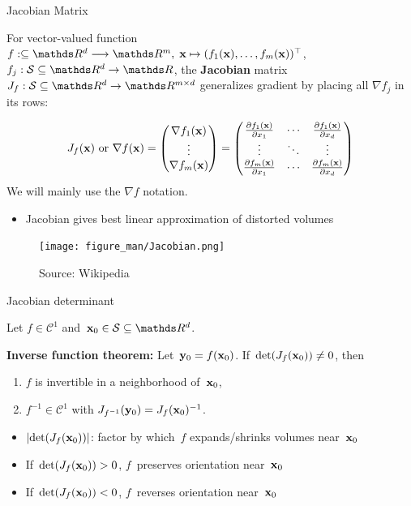 \documentclass[11pt,compress,t,notes=noshow, xcolor=table]{beamer}
\begin{document}
\begin{vbframe}{Jacobian Matrix}

For vector-valued function~$f:\subseteq \R^d\longrightarrow\R^m,\; \xv\mapsto(f_1(\xv),\dots,f_m(\xv))^\top$, $f_j:\mathcal{S}\subseteq \R^d\to\R$, the \textbf{Jacobian} matrix $J_f:\mathcal{S}\subseteq \R^d \to \R^{m\times d}$ generalizes gradient by placing all $\nabla f_j$ in its rows:

\begin{equation*}
    J_f(\mathbf{x}) \text{ or } \nabla f(\mathbf{x}) = \begin{pmatrix}
        \nabla f_1(\mathbf{x}) \\
        \vdots \\
        \nabla f_m(\mathbf{x})
	\end{pmatrix}
    =
    \begin{pmatrix}
        \frac{\partial f_1(\mathbf{x})}{\partial x_1} & \cdots & \frac{\partial f_1(\mathbf{x})}{\partial x_d} \\
        \vdots &  \ddots & \vdots \\
        \frac{\partial f_m(\mathbf{x})}{\partial x_1} & \cdots & \frac{\partial f_m(\mathbf{x})}{\partial x_d}
	\end{pmatrix}
\end{equation*}
We will mainly use the $\nabla f$ notation.

\begin{itemize}
    \item Jacobian gives best linear approximation of distorted volumes
\end{itemize}

\begin{figure}
    \centering
    \texttt{[image: figure\_man/Jacobian.png]}
    \caption*{\footnotesize Source: Wikipedia}
\end{figure}

\end{vbframe}


\begin{vbframe}{Jacobian determinant}

Let $f\in\mathcal{C}^1$ and~$\xv_0\in\mathcal{S}\subseteq \R^d$.


\textbf{Inverse function theorem:} Let~$\mathbf{y}_0=f(\mathbf{x}_0)$.
    If~$\det(J_f(\mathbf{x}_0))\not=0$, then
    \begin{enumerate}
        \item $f$ is invertible in a neighborhood of~$\mathbf{x}_0$,
        \item $f^{-1}\in\mathcal{C}^1$ with $J_{f^{-1}}(\mathbf{y}_0) = J_f(\mathbf{x}_0)^{-1}$.
    \end{enumerate}


\begin{itemize}
    \item $|{\det(J_f(\mathbf{x}_0))}|$: factor by which~$f$ expands/shrinks volumes near~$\mathbf{x}_0$
    \item If~$\det(J_f(\mathbf{x}_0))>0$, $f$~preserves orientation near~$\mathbf{x}_0$
    \item If~$\det(J_f(\mathbf{x}_0))<0$, $f$~reverses orientation near~$\mathbf{x}_0$
\end{itemize}

\end{vbframe}
\end{document}
